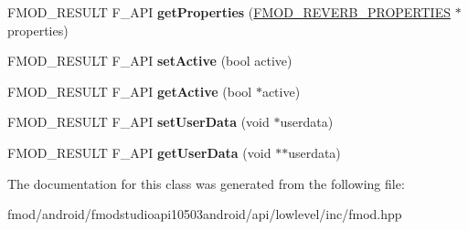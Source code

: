 \begin{DoxyCompactItemize}
\item 
\hypertarget{class_f_m_o_d_1_1_reverb3_d_a63821bb5d2f34e3f246cb91e49188871}{F\+M\+O\+D\+\_\+\+R\+E\+S\+U\+L\+T F\+\_\+\+A\+P\+I {\bfseries get\+Properties} (\hyperlink{struct_f_m_o_d___r_e_v_e_r_b___p_r_o_p_e_r_t_i_e_s}{F\+M\+O\+D\+\_\+\+R\+E\+V\+E\+R\+B\+\_\+\+P\+R\+O\+P\+E\+R\+T\+I\+E\+S} $\ast$properties)}\label{class_f_m_o_d_1_1_reverb3_d_a63821bb5d2f34e3f246cb91e49188871}

\item 
\hypertarget{class_f_m_o_d_1_1_reverb3_d_ad645e360dfba70bf521f7258370a4028}{F\+M\+O\+D\+\_\+\+R\+E\+S\+U\+L\+T F\+\_\+\+A\+P\+I {\bfseries set\+Active} (bool active)}\label{class_f_m_o_d_1_1_reverb3_d_ad645e360dfba70bf521f7258370a4028}

\item 
\hypertarget{class_f_m_o_d_1_1_reverb3_d_afc78687f3aec76b996218fa22e0c25cb}{F\+M\+O\+D\+\_\+\+R\+E\+S\+U\+L\+T F\+\_\+\+A\+P\+I {\bfseries get\+Active} (bool $\ast$active)}\label{class_f_m_o_d_1_1_reverb3_d_afc78687f3aec76b996218fa22e0c25cb}

\item 
\hypertarget{class_f_m_o_d_1_1_reverb3_d_a7e4d0fb62d33f2cbca23e38998f8e53c}{F\+M\+O\+D\+\_\+\+R\+E\+S\+U\+L\+T F\+\_\+\+A\+P\+I {\bfseries set\+User\+Data} (void $\ast$userdata)}\label{class_f_m_o_d_1_1_reverb3_d_a7e4d0fb62d33f2cbca23e38998f8e53c}

\item 
\hypertarget{class_f_m_o_d_1_1_reverb3_d_a6acd23caa1ebbee25749bd390280d045}{F\+M\+O\+D\+\_\+\+R\+E\+S\+U\+L\+T F\+\_\+\+A\+P\+I {\bfseries get\+User\+Data} (void $\ast$$\ast$userdata)}\label{class_f_m_o_d_1_1_reverb3_d_a6acd23caa1ebbee25749bd390280d045}

\end{DoxyCompactItemize}


The documentation for this class was generated from the following file\+:\begin{DoxyCompactItemize}
\item 
fmod/android/fmodstudioapi10503android/api/lowlevel/inc/fmod.\+hpp\end{DoxyCompactItemize}
